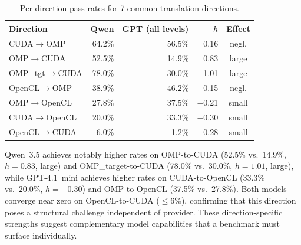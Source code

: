 \documentclass[conference]{IEEEtran}
\begin{document}
\begin{table}[h]
\centering
\caption{Per-direction pass rates for 7 common translation directions.}
\label{tab:cross-model-direction}
\footnotesize
\begin{tabular}{lrrrc}
\toprule
\textbf{Direction} & \textbf{Qwen} & \textbf{GPT (all levels)} & \textbf{$h$} & \textbf{Effect} \\
\midrule
CUDA$\to$OMP             & 64.2\% & 56.5\% & 0.16  & negl. \\
OMP$\to$CUDA             & 52.5\% & 14.9\% & 0.83  & large \\
OMP\_tgt$\to$CUDA        & 78.0\% & 30.0\% & 1.01  & large \\
OpenCL$\to$OMP           & 38.9\% & 46.2\% & $-$0.15 & negl. \\
OMP$\to$OpenCL           & 27.8\% & 37.5\% & $-$0.21 & small \\
CUDA$\to$OpenCL          & 20.0\% & 33.3\% & $-$0.30 & small \\
OpenCL$\to$CUDA          &  6.0\% &  1.2\% & 0.28  & small \\
\bottomrule
\end{tabular}
\end{table}

Qwen~3.5 achieves notably higher rates on OMP-to-CUDA (52.5\% vs.\
14.9\%, $h = 0.83$, large) and OMP\_target-to-CUDA (78.0\% vs.\ 30.0\%, $h = 1.01$, large),
while GPT-4.1~mini achieves higher rates on CUDA-to-OpenCL (33.3\% vs.\
20.0\%, $h = -0.30$) and OMP-to-OpenCL (37.5\% vs.\ 27.8\%). Both
models converge near zero on OpenCL-to-CUDA ($\leq$6\%), confirming
that this direction poses a structural challenge independent of provider.
These direction-specific strengths suggest complementary model
capabilities that a benchmark must surface individually.
\end{document}
